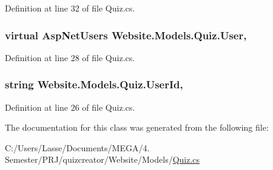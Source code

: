 Definition at line 32 of file Quiz.\+cs.

\hypertarget{class_website_1_1_models_1_1_quiz_ab9a38cf45b9b17c393670c6292e4b29f}{}
\subsubsection[{User}]{\setlength{\rightskip}{0pt plus 5cm}virtual {\bf Asp\+Net\+Users} Website.\+Models.\+Quiz.\+User\hspace{0.3cm}{\ttfamily [get]}, {\ttfamily [set]}}\label{class_website_1_1_models_1_1_quiz_ab9a38cf45b9b17c393670c6292e4b29f}


Definition at line 28 of file Quiz.\+cs.

\hypertarget{class_website_1_1_models_1_1_quiz_a97afd124e788d2496e83c8a5c9ccb51f}{}
\subsubsection[{User\+Id}]{\setlength{\rightskip}{0pt plus 5cm}string Website.\+Models.\+Quiz.\+User\+Id\hspace{0.3cm}{\ttfamily [get]}, {\ttfamily [set]}}\label{class_website_1_1_models_1_1_quiz_a97afd124e788d2496e83c8a5c9ccb51f}


Definition at line 26 of file Quiz.\+cs.



The documentation for this class was generated from the following file\+:\begin{DoxyCompactItemize}
\item 
C\+:/\+Users/\+Lasse/\+Documents/\+M\+E\+G\+A/4. Semester/\+P\+R\+J/quizcreator/\+Website/\+Models/\hyperlink{_quiz_8cs}{Quiz.\+cs}\end{DoxyCompactItemize}

